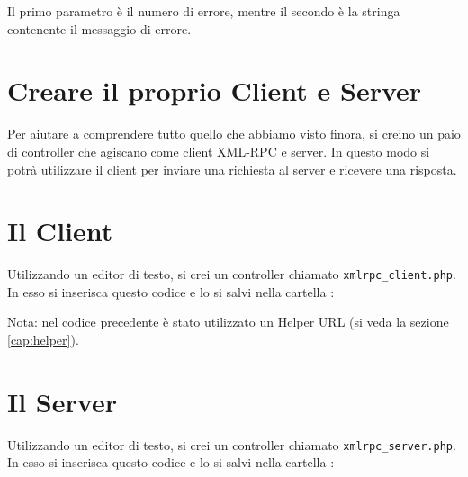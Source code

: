 
Il primo parametro è il numero di errore, mentre il secondo è la stringa contenente il messaggio di errore.

\section*{Creare il proprio Client e Server}

Per aiutare a comprendere tutto quello che abbiamo visto finora, si creino un paio di controller che agiscano come client XML-RPC e server. In questo modo si potrà utilizzare il client per inviare una richiesta al server e ricevere una risposta. 

\section*{Il Client}

Utilizzando un editor di testo, si crei un controller chiamato \verb|xmlrpc_client.php|. In esso si inserisca questo codice e lo si salvi nella cartella :


Nota: nel codice precedente è stato utilizzato un Helper URL (si veda la sezione \vref{cap:helper}).

\section*{Il Server}
Utilizzando un editor di testo, si crei un controller chiamato \verb|xmlrpc_server.php|. In esso si inserisca questo codice e lo si salvi nella cartella :

